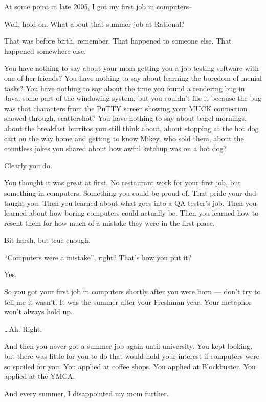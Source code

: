\noindent At some point in late 2005, I got my first job in computers--

\begin{ally}
Well, hold on. What about that summer job at Rational?
\end{ally}
That was before birth, remember. That happened to someone else. That happened somewhere else.

\begin{ally}
You have nothing to say about your mom getting you a job testing software with one of her friends? You have nothing to say about learning the boredom of menial tasks? You have nothing to say about the time you found a rendering bug in Java, some part of the windowing system, but you couldn't file it because the bug was that characters from the PuTTY screen showing your MUCK connection showed through, scattershot? You have nothing to say about bagel mornings, about the breakfast burritos you still think about, about stopping at the hot dog cart on the way home and getting to know Mikey, who sold them, about the countless jokes you shared about how awful ketchup was on a hot dog?
\end{ally}
Clearly you do.

\begin{ally}
You thought it was great at first. No restaurant work for your first job, but something in computers. Something you could be proud of. That pride your dad taught you. Then you learned about what goes into a QA tester's job. Then you learned about how boring computers could actually be. Then you learned how to resent them for how much of a mistake they were in the first place.
\end{ally}
Bit harsh, but true enough.

\begin{ally}
``Computers were a mistake'', right? That's how you put it?
\end{ally}
Yes.

\begin{ally}
So you got your first job in computers shortly after you were born --- don't try to tell me it wasn't. It was the summer after your Freshman year. Your metaphor won't always hold up.
\end{ally}
\ldots{}Ah. Right.

\begin{ally}
And then you never got a summer job again until university. You kept looking, but there was little for you to do that would hold your interest if computers were so spoiled for you. You applied at coffee shops. You applied at Blockbuster. You applied at the YMCA.
\end{ally}
And every summer, I disappointed my mom further.
\newpage

